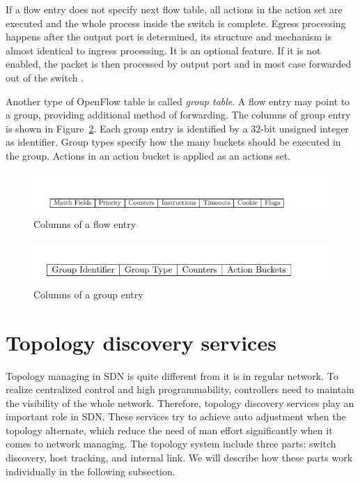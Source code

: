 If a flow entry does not specify next flow table, all actions in the action set are executed and the whole process inside the switch is complete. Egress processing happens after the output port is determined, its structure and mechanism is almost identical to ingress processing. It is an optional feature. If it is not enabled, the packet is then processed by output port and in most case forwarded out of the switch \cite{OF_SPEC}. 

Another type of OpenFlow table is called \textit{group table}. A flow entry may point to a group, providing additional method of forwarding. The columns of group entry is shown in Figure~\ref{GE_Col}. Each group entry is identified by a 32-bit unsigned integer as identifier. Group types specify how the many buckets should be executed in the group. Actions in an action bucket is applied as an actions set.

\begin{figure}[H]
\begin{center} 
\includegraphics[width=1\textwidth]{figures/columns_of_flow_entry.png}
\end{center}
\caption{Columns of a flow entry}
\label{FE_Col}
\end{figure}

\begin{figure}[H]
\begin{center} 
\includegraphics[width=1\textwidth]{figures/group_table.png}
\end{center}
\caption{Columns of a group entry}
\label{GE_Col}
\end{figure}

\section{Topology discovery services}
\label{Topology discovery services}
Topology managing in SDN is quite different from it is in regular network. To realize centralized control and high programmability, controllers need to maintain the visibility of the whole network. Therefore, topology discovery services play an important role in SDN. These services try to achieve auto adjustment when the topology alternate, which reduce the need of man effort significantly when it comes to network managing. The topology system include three parts: switch discovery, host tracking, and internal link. We will describe how these parts work individually in the following subsection.

